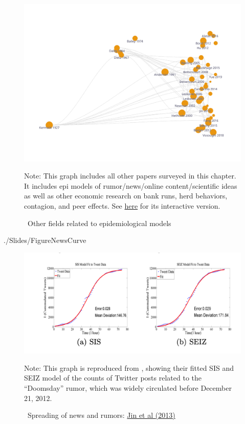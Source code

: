 \begin{figure}[!ht] \centering  %
	\caption{ ~Other fields related to epidemiological models}
	\label{fig:graph_other}
	\centerline{\includegraphics[width=\textwidth]{./figures/graph_other}}
				\begin{flushleft}{\footnotesize Note: This graph includes all other papers surveyed in this chapter. It includes epi models of rumor/news/online content/scientific ideas as well as other economic research on bank runs, herd behaviors, contagion, and peer effects. See \href{https://app.litmaps.co/shared/B5FA1F14-01A8-4C9D-BF23-BE0F62293FAF}{here} for its interactive version.}
						\end{flushleft}
\end{figure}


\newpage


\begin{verbatimwrite}{./Slides/FigureNewsCurve}
\begin{figure}[!ht] \centering  %
	\caption{ ~Spreading of news and rumors: \href{https://people.cs.vt.edu/ramakris/papers/news-rumor-epi-snakdd13.pdf}{Jin et al (2013)}}\nocite{jin2013epidemiological}
	\label{fig:news_curve}
	\centerline{\includegraphics[width=\textwidth]{./figures/Doomsday.png}}
		\begin{flushleft}{\footnotesize Note: This graph is reproduced from \cite{jin2013epidemiological}, showing their fitted SIS and SEIZ model of the counts of Twitter posts related to the ``Doomsday'' rumor, which was widely circulated before December 21, 2012.}
	\end{flushleft}
\end{figure}
\end{verbatimwrite}%


